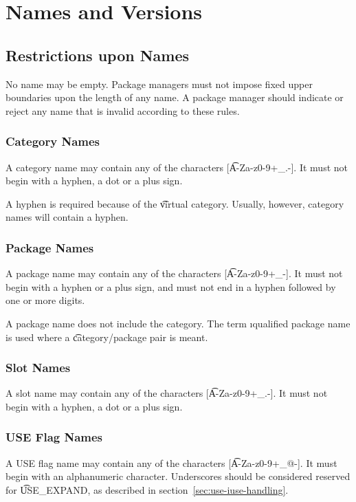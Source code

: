 \chapter{Names and Versions}

\section{Restrictions upon Names}

No name may be empty. Package managers must not impose fixed upper boundaries upon the length of any
name. A package manager should indicate or reject any name that is invalid according to these rules.

\subsection{Category Names}
A category name may contain any of the characters [\t{A-Za-z0-9+\_.-}]. It must not begin with
a hyphen, a dot or a plus sign.

\note A hyphen is  required because of the \t{virtual} category. Usually, however, category
names will contain a hyphen.

\subsection{Package Names}
A package name may contain any of the characters [\t{A-Za-z0-9+\_-}]. It must not begin with a
hyphen or a plus sign, and must not end in a hyphen followed by one or more digits.

\note A package name does not include the category. The term \i{qualified package name} is used
where a \t{category/package} pair is meant.

\subsection{Slot Names}
\label{sec:slot-names}
A slot name may contain any of the characters [\t{A-Za-z0-9+\_.-}]. It must not begin with a
hyphen, a dot or a plus sign.

\subsection{USE Flag Names}
A USE flag name may contain any of the characters [\t{A-Za-z0-9+\_@-}]. It must begin with an
alphanumeric character. Underscores should be considered reserved for \t{USE\_EXPAND}, as
described in section~\ref{sec:use-iuse-handling}.

